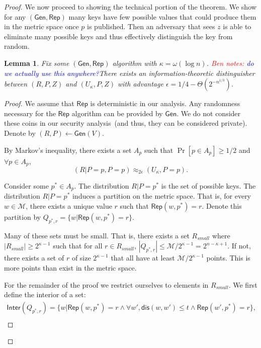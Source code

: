 \documentclass[11pt]{article}
\newcommand{\class}[1]{{\ensuremath{\mathsf{#1}}}}
\newcommand{\gen}{\ensuremath{\class{Gen}}\xspace}
\newcommand{\rep}{\ensuremath{\class{Rep}}\xspace}
\newcommand{\sketch}{\ensuremath{\class{SS}}\xspace}
\newcommand{\rec}{\ensuremath{\class{Rec}}\xspace}
\newcommand{\crust}{\ensuremath{\class{Crust}}\xspace}
\newcommand{\inter}{\ensuremath{\class{Inter}}\xspace}
\newcommand{\dis}{\ensuremath{\mathsf{dis}}}
\newtheorem{lemma}[theorem]{Lemma}
\newcommand{\authnote}[2]{{\textcolor{red}{\textsf{#1 notes: }\textcolor{blue}{ #2}}\marginpar{\textcolor{red}{\textbf{!!!!!}}}}}
\newcommand{\authnote}[2]{}
\newcommand{\bnote}[1]{{\authnote{Ben}{#1}}}
\begin{document}
\begin{proof}
We now proceed to showing the technical portion of the theorem.  We show for any $(\gen, \rep)$ many keys have few possible values that could produce them in the metric space once $p$ is published.  Then an adversary that sees $z$ is able to eliminate many possible keys and thus effectively distinguish the key from random.

\begin{lemma}
Fix some $(\gen, \rep)$ algorithm with $\kappa = \omega(\log n)$.  \bnote{do we actually use this anywhere?}There exists an information-theoretic distinguisher between $(R, P, Z)$ and $(U_\kappa, P, Z)$ with advantage $\epsilon = 1/4-\Theta(2^{-n^{1/3}})$.
\end{lemma}
\begin{proof}
We assume that $\rep$ is deterministic in our analysis.  Any randomness necessary for the \rep algorithm can be provided by $\gen$.  We do not consider these coins in our security analysis~(and thus, they can be considered private).  Denote by $(R, P) \leftarrow \gen(V)$.

By Markov's inequality, there exists a set $A_{p}$ such that $\Pr[p\in A_{p}]\ge 1/2$ and $\forall p\in A_{p}$, 
\[
(R |P =p, P = p ) \approx_{2\epsilon} (U_\kappa , P =p).
\]

Consider some $p^*\in A_{p}$.  %
The distribution $R|P=p^*$ is the set of possible keys.
The distribution $R|P=p^*$ induces a partition on the metric space.  That is, for every $w\in\mathcal{M}$, there exists a unique value $r$ such that $\rep(w, p^*) =r$.  Denote this partition by $Q_{p^*,r} = \{w | \rep(w, p^*) = r\}$.  

Many of these sets must be small.  That is, there exists a set $R_{small}$  where $|R_{small} | \ge 2^{\kappa-1}$ such that for all $r\in R_{small}$,  $|Q_{p^*, r}|\le \mathcal{M}/2^{\kappa-1} = 2^{n-\kappa +1}$.  If not, there exists a set of $r$ of size $2^{\kappa-1}$ that all have at least $\mathcal{M}/2^{\kappa-1}$ points.  This is more points than exist in the metric space.  

For the remainder of the proof we restrict ourselves to elements in $R_{small}$.  We first define the interior of a set:%
\begin{align*}
\inter(Q_{p^*, r}) = \{w | \rep(w, p^*) = r \wedge \forall w', \dis(w, w') \le t \wedge \rep(w', p^*) =r\},\\
\end{align*}


\end{proof}
\end{proof}
\end{document}
